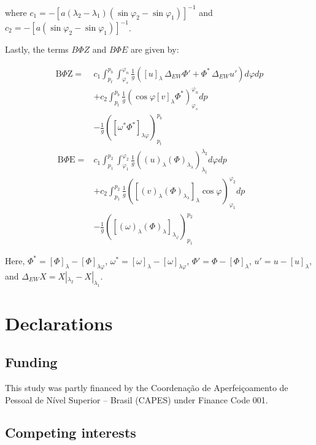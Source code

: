 \documentclass[pdflatex,sn-chicago]{sn-jnl}%
\theoremstyle{plain}
\theoremstyle{definition}
\theoremstyle{remark}
\theoremstyle{definition}
\begin{document}
where $c_1=-\left[a\left(\lambda_2-\lambda_1\right)\left(\sin \varphi_2-\sin \varphi_1\right)\right]^{-1}$ and $c_2=-\left[a\left(\sin \varphi_2-\sin \varphi_1\right)\right]^{-1}$.


Lastly, the terms $B\Phi Z$ and $B\Phi E$ are given by:

\begin{align}
\mathrm{B} \Phi \mathrm{Z}= & c_1 \int_{p_t}^{p_b} \int_{\varphi_s}^{\varphi_n} \frac{1}{g}\left([u]_\lambda\,\Delta_{EW}\Phi' + \Phi^*\,\Delta_{EW}u'\right) d \varphi d p \nonumber \\
& +c_2 \int_{p_t}^{p_b} \frac{1}{g}\left(\cos \varphi[v]_\lambda\Phi^*\right)_{\varphi_s}^{\varphi_n} d p  \\
& -\frac{1}{g}\left(\left[\omega^*\Phi^*\right]_{\lambda\varphi}\right)_{p_t}^{p_b} \nonumber \\
\mathrm{~B} \Phi \mathrm{E}= & c_1 \int_{p_1}^{p_2} \int_{\varphi_1}^{\varphi_2} \frac{1}{g}\left((u)_\lambda(\Phi)_{\lambda_\lambda}\right)_{\lambda_1}^{\lambda_2} d \varphi d p \nonumber \\
& +c_2 \int_{p_1}^{p_2} \frac{1}{g}\left(\left[(v)_\lambda(\Phi)_{\lambda_\lambda}\right]_\lambda \cos \varphi\right)_{\varphi_1}^{\varphi_2} d p \\
& -\frac{1}{g}\left(\left[(\omega)_\lambda(\Phi)_\lambda\right]_{\lambda_{\varphi}}\right)_{p_1}^{p_2} \nonumber
\end{align}

Here, $\Phi^*=[\Phi]_\lambda-[\Phi]_{\lambda\varphi}$, $\omega^*=[\omega]_\lambda-[\omega]_{\lambda\varphi}$, $\Phi'=\Phi-[\Phi]_\lambda$, $u'=u-[u]_\lambda$, and $\Delta_{EW}X=X|_{\lambda_2}-X|_{\lambda_1}$.

\section*{Declarations}

\subsection*{Funding}

This study was partly financed by the Coordenação de Aperfeiçoamento de Pessoal de Nível Superior – Brasil (CAPES) under Finance Code 001.

\subsection*{Competing interests}
\end{document}
